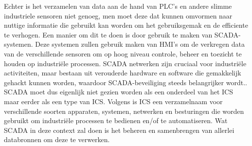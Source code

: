 Echter is het verzamelen van data aan de hand van PLC’s en andere slimme industriele sensoren niet genoeg, men moet deze dat kunnen omvormen naar nuttige informatie die gebruikt kan worden om het gebruiksgemak en de efficiente te verhogen. Een manier om dit te doen is door gebruik te maken van SCADA-systemen. 
Deze systemen zullen gebruik maken van HMI’s om de verkregen data van de verschillende sensoren om op hoog niveau controle, beheer en toezicht te houden op industriële processen. SCADA netwerken zijn cruciaal voor industriële activiteiten, maar bestaan uit verouderde hardware en software die gemakkelijk gehackt kunnen worden, waardoor SCADA-beveiliging steeds belangrijker wordt.\autocite{FortinetSC2025}. SCADA moet dus eigenlijk niet gezien worden als een onderdeel van het ICS maar eerder als een type van ICS. 
Volgens \textcite{Mhaskar2021} is ICS een verzamelnaam voor verschillende soorten apparaten, systemen, netwerken en besturingen die worden gebruikt om industriële processen te bedienen en/of te automatiseren. Wat SCADA in deze context zal doen is het beheren en samenbrengen van allerlei databronnen om deze te verwerken.


